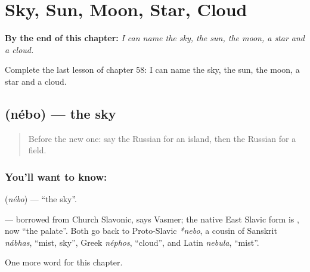 
\chapter{Sky, Sun, Moon, Star, Cloud}
\label{ch:ru-sky-sun-moon-star-cloud}

\begin{chapteropening}
\textbf{By the end of this chapter:} \emph{I can name the sky, the sun, the moon, a star and a cloud.}

Complete the last lesson of chapter 58: I can name the sky, the sun, the moon, a star and a cloud.
\end{chapteropening}

\section[\texorpdfstring{\ru{небо} (nébo)}{небо (nébo)}]{ (nébo) — the sky}

\label{lesson:RU-C58-sky}



\begin{quote}
Before the new one: say the Russian for an island, then the Russian for a field.
\end{quote}

\subsection*{You'll want to know: }
\textbf{} (\emph{nébo}) — \textquotedblleft{}the sky\textquotedblright{}.

\begin{cousinweb}
\textbf{} — borrowed from Church Slavonic, says Vasmer; the native East Slavic form is \emph{}, now \textquotedblleft{}the palate\textquotedblright{}. Both go back to Proto-Slavic \emph{*nebo}, a cousin of Sanskrit \emph{nábhas}, \textquotedblleft{}mist, sky\textquotedblright{}, Greek \emph{néphos}, \textquotedblleft{}cloud\textquotedblright{}, and Latin \emph{nebula}, \textquotedblleft{}mist\textquotedblright{}.
\end{cousinweb}

\begin{grammarlens}[title={What you've built}]
One more word for this chapter.
\end{grammarlens}

